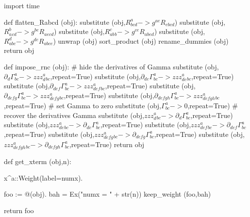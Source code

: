\documentclass[12pt]{cdblatex}
\begin{document}
\begin{cadabra}
   import time

   def flatten_Rabcd (obj):
       substitute (obj,$R^{a}_{b c d}   -> g^{a e} R_{e b c d}$)
       substitute (obj,$R_{a}^{b}_{c d} -> g^{b e} R_{a e c d}$)
       substitute (obj,$R_{a b}^{c}_{b} -> g^{c e} R_{a b e d}$)
       substitute (obj,$R_{a b c}^{d}   -> g^{d e} R_{a b c e}$)
       unwrap     (obj)
       sort_product   (obj)
       rename_dummies (obj)
       return obj

   def impose_rnc (obj):
       # hide the derivatives of Gamma
       substitute (obj,$\partial_{d}{\Gamma^{a}_{b c}} -> zzz_{d}^{a}_{b c}$,repeat=True)
       substitute (obj,$\partial_{d e}{\Gamma^{a}_{b c}} -> zzz_{d e}^{a}_{b c}$,repeat=True)
       substitute (obj,$\partial_{d e f}{\Gamma^{a}_{b c}} -> zzz_{d e f}^{a}_{b c}$,repeat=True)
       substitute (obj,$\partial_{d e f g}{\Gamma^{a}_{b c}} -> zzz_{d e f g}^{a}_{b c}$,repeat=True)
       substitute (obj,$\partial_{d e f g h}{\Gamma^{a}_{b c}} -> zzz_{d e f g h}^{a}_{b c}$,repeat=True)
       # set Gamma to zero
       substitute (obj,$\Gamma^{a}_{b c} -> 0$,repeat=True)
       # recover the derivatives Gamma
       substitute (obj,$zzz_{d}^{a}_{b c} -> \partial_{d}{\Gamma^{a}_{b c}}$,repeat=True)
       substitute (obj,$zzz_{d e}^{a}_{b c} -> \partial_{d e}{\Gamma^{a}_{b c}}$,repeat=True)
       substitute (obj,$zzz_{d e f}^{a}_{b c} -> \partial_{d e f}{\Gamma^{a}_{b c}}$,repeat=True)
       substitute (obj,$zzz_{d e f g}^{a}_{b c} -> \partial_{d e f g}{\Gamma^{a}_{b c}}$,repeat=True)
       substitute (obj,$zzz_{d e f g h}^{a}_{b c} -> \partial_{d e f g h}{\Gamma^{a}_{b c}}$,repeat=True)
       return obj

   def get_xterm (obj,n):

       x^{a}::Weight(label=numx).

       foo := @(obj).
       bah  = Ex("numx = " + str(n))
       keep_weight (foo,bah)

       return foo


\end{cadabra}
\end{document}
